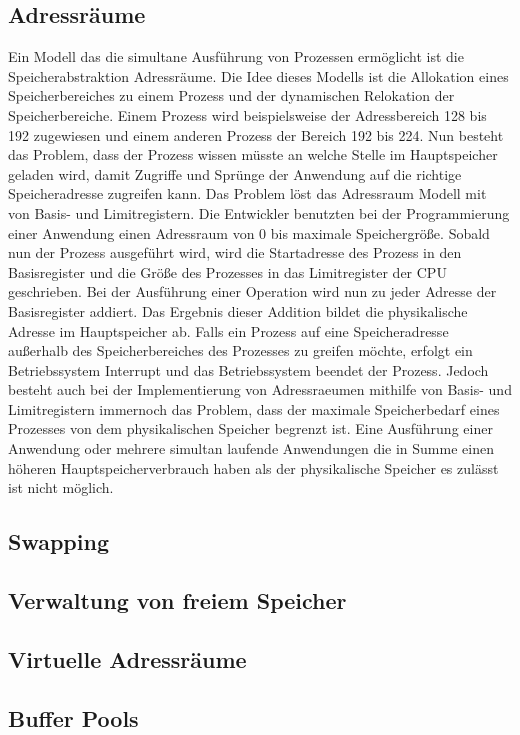 \subsection{Adressr\"{a}ume}
\label{subsec:Adressraeume}
Ein Modell das die simultane Ausführung von Prozessen ermöglicht ist die Speicherabstraktion Adressräume. Die Idee dieses Modells ist die Allokation eines Speicherbereiches zu einem Prozess und der dynamischen Relokation der Speicherbereiche. Einem Prozess wird beispielsweise der Adressbereich 128 bis 192 zugewiesen und einem anderen Prozess der Bereich 192 bis 224. Nun besteht das Problem, dass der Prozess wissen müsste an welche Stelle im Hauptspeicher geladen wird, damit Zugriffe und Sprünge der Anwendung auf die richtige Speicheradresse zugreifen kann. Das Problem löst das Adressraum Modell mit von Basis- und Limitregistern. Die Entwickler benutzten bei der Programmierung einer Anwendung einen Adressraum von 0 bis maximale Speichergröße. Sobald nun der Prozess ausgeführt wird, wird die Startadresse des Prozess in den Basisregister und die Größe des Prozesses in das Limitregister der CPU geschrieben. Bei der Ausführung einer Operation wird nun zu jeder Adresse der Basisregister addiert. Das Ergebnis dieser Addition bildet die physikalische Adresse im Hauptspeicher ab. Falls ein Prozess auf eine Speicheradresse außerhalb des Speicherbereiches des Prozesses zu greifen möchte, erfolgt ein Betriebssystem Interrupt und das Betriebssystem beendet der Prozess. Jedoch besteht auch bei der Implementierung von Adressraeumen mithilfe von Basis- und Limitregistern immernoch das Problem, dass der maximale Speicherbedarf eines Prozesses von dem physikalischen Speicher begrenzt ist. Eine Ausführung einer Anwendung oder mehrere simultan laufende Anwendungen die in Summe einen höheren Hauptspeicherverbrauch haben als der physikalische Speicher es zulässt ist nicht möglich.

\subsection{Swapping}
\label{subsec:Swapping}

\subsection{Verwaltung von freiem Speicher}
\label{subsec:VerwaltungFreiemSpeicher}

\subsection{Virtuelle Adressr\"{a}ume}
\label{subsec:VirtuelleAdressraeume}

\subsection{Buffer Pools}
\label{subsec:BufferPools}
